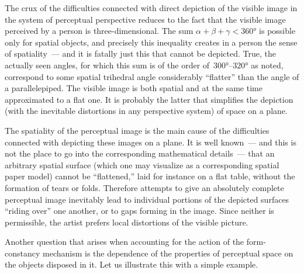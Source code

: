 
The crux of the difficulties connected with direct depiction of the visible image in the
system of perceptual perspective reduces to the fact that the visible image perceived by
a person is three-dimensional.  The sum $\alpha + \beta + \gamma < 360°$ is possible
only for spatial objects, and precisely this inequality creates in a person the sense of
spatiality~--- and it is fatally just this that cannot be depicted.  True, the actually seen
angles, for which this sum is of the order of~$300°\text{--}320°$ as noted, correspond
to some spatial trihedral angle considerably ``flatter'' than the angle of a parallelepiped.
The visible image is both spatial and at the same time approximated to a flat one.  It is
probably the latter that simplifies the depiction (with the inevitable distortions in any
perspective system) of space on a plane.

The spatiality of the perceptual image is the main cause of the difficulties connected
with depicting these images on a plane.  It is well known~--- and this is not the place
to go into the corresponding mathematical details~--- that an arbitrary spatial surface
(which one may visualize as a corresponding spatial paper model) cannot be
``flattened,'' laid for instance on a flat table, without the formation of tears or folds.
Therefore attempts to give an absolutely complete perceptual image inevitably lead to
individual portions of the depicted surfaces ``riding over'' one another, or to gaps
forming in the image.  Since neither is permissible, the artist prefers local distortions
of the visible picture.


Another question that arises when accounting for the action of the form-constancy
mechanism is the dependence of the properties of perceptual space on the objects
disposed in it.  Let us illustrate this with a simple example.


